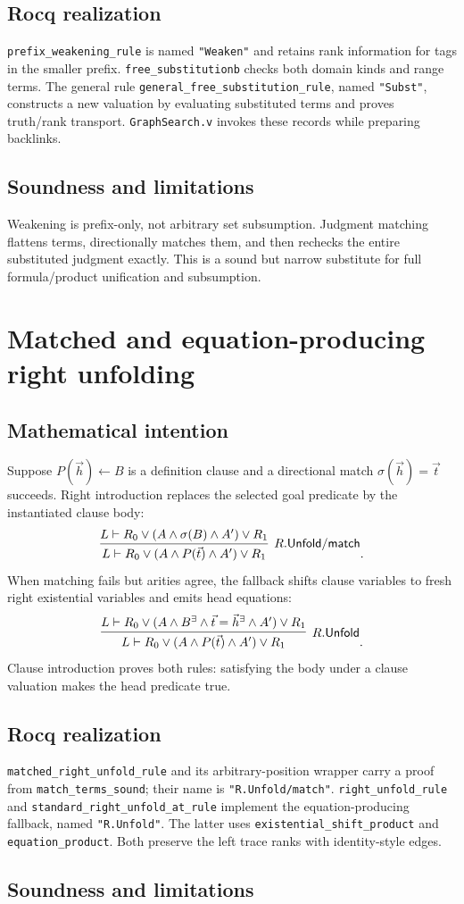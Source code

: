 \documentclass[11pt,oneside]{book}
\DeclareRobustCommand{\code}[1]{\nolinkurl{#1}}
\DeclareRobustCommand{\file}[1]{\nolinkurl{#1}}
\newcommand{\mathintent}{\subsection*{Mathematical intention}}
\newcommand{\rocqreal}{\subsection*{Rocq realization}}
\newcommand{\soundlim}{\subsection*{Soundness and limitations}}
\begin{document}
\rocqreal

\code{prefix_weakening_rule} is named \code{"Weaken"} and retains rank
information for tags in the smaller prefix.  \code{free_substitutionb} checks
both domain kinds and range terms.  The general rule
\code{general_free_substitution_rule}, named \code{"Subst"}, constructs a new
valuation by evaluating substituted terms and proves truth/rank transport.
\file{GraphSearch.v} invokes these records while preparing backlinks.

\soundlim

Weakening is prefix-only, not arbitrary set subsumption.  Judgment matching
flattens terms, directionally matches them, and then rechecks the entire
substituted judgment exactly.  This is a sound but narrow substitute for full
formula/product unification and subsumption.

\section{Matched and equation-producing right unfolding}

\mathintent

Suppose \(P(\vec h)\leftarrow B\) is a definition clause and a directional
match \(\sigma(\vec h)=\vec t\) succeeds.  Right introduction replaces the
selected goal predicate by the instantiated clause body:
\[
 \infer[R.\mathsf{Unfold}/\mathsf{match}]
       {L\vdash R_0\lor(A\land P(\vec t)\land A')\lor R_1}
       {L\vdash R_0\lor(A\land \sigma(B)\land A')\lor R_1}.
\]
When matching fails but arities agree, the fallback shifts clause variables to
fresh right existential variables and emits head equations:
\[
 \infer[R.\mathsf{Unfold}]
       {L\vdash R_0\lor(A\land P(\vec t)\land A')\lor R_1}
       {L\vdash R_0\lor
        (A\land B^{\exists}\land\vec t=\vec h^{\exists}\land A')\lor R_1}.
\]
Clause introduction proves both rules: satisfying the body under a clause
valuation makes the head predicate true.

\rocqreal

\code{matched_right_unfold_rule} and its arbitrary-position wrapper carry a
proof from \code{match_terms_sound}; their name is
\code{"R.Unfold/match"}.  \code{right_unfold_rule} and
\code{standard_right_unfold_at_rule} implement the equation-producing
fallback, named \code{"R.Unfold"}.  The latter uses
\code{existential_shift_product} and \code{equation_product}.  Both preserve
the left trace ranks with identity-style edges.

\soundlim
\end{document}
